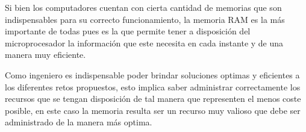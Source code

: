 \documentclass{article}
\begin{document}
Si bien los computadores cuentan con cierta cantidad de memorias que son indispensables para su correcto funcionamiento, la memoria RAM es la más importante de todas pues es la que permite tener a disposición del microprocesador la información que este necesita en cada instante y de una manera muy eficiente.

Como ingeniero es indispensable poder brindar soluciones optimas y eficientes a los diferentes retos propuestos, esto implica saber administrar correctamente los recursos que se tengan disposición de tal manera que representen el menos coste posible, en este caso la memoria resulta ser un recurso muy valioso que debe ser administrado de la manera más optima.



\end{document}
